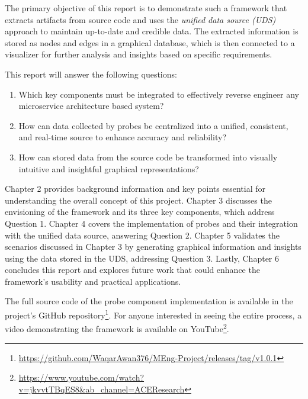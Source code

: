 The primary objective of this report is to demonstrate such a framework that extracts artifacts from source code and uses the \textit{unified data source (UDS)} approach to maintain up-to-date and credible data. The extracted information is stored as nodes and edges in a graphical database, which is then connected to a visualizer for further analysis and insights based on specific requirements.

This report will answer the following questions:
\begin{enumerate}
    \item Which key components must be integrated to effectively reverse engineer any microservice architecture based system?
    \item How can data collected by probes be centralized into a unified, consistent, and real-time source to enhance accuracy and reliability?
    \item How can stored data from the source code be transformed into visually intuitive and insightful graphical representations?
\end{enumerate}

Chapter 2 provides background information and key points essential for understanding the overall concept of this project. Chapter 3 discusses the envisioning of the framework and its three key components, which address Question 1. Chapter 4 covers the implementation of probes and their integration with the unified data source, answering Question 2. Chapter 5 validates the scenarios discussed in Chapter 3 by generating graphical information and insights using the data stored in the UDS, addressing Question 3. Lastly, Chapter 6 concludes this report and explores future work that could enhance the framework's usability and practical applications.

The full source code of the probe component implementation is available in the project's GitHub repository\footnote{\url{https://github.com/WaqarAwan376/MEng-Project/releases/tag/v1.0.1}}. For anyone interested in seeing the entire process, a video demonstrating the framework is available on YouTube\footnote{\url{https://www.youtube.com/watch?v=jkvvtTBqES8&ab_channel=ACEResearch}}.